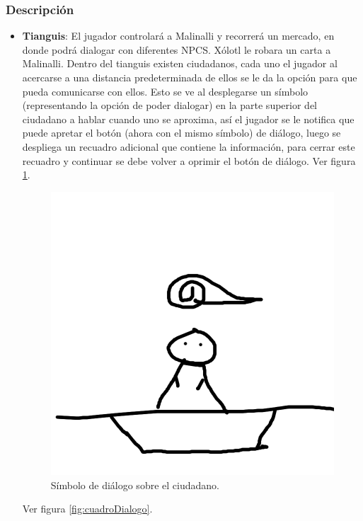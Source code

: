 \documentclass[11pt,letterpaper]{article}
\begin{document}
	\subsubsection{Descripción}
	\begin{itemize}
		\item\textbf{Tianguis}: El jugador controlará a Malinalli y recorrerá un mercado, en donde podrá dialogar con diferentes NPCS. Xólotl le robara un carta a Malinalli.
		Dentro del tianguis existen ciudadanos, cada uno el jugador al acercarse a una distancia predeterminada de ellos se le da la opción para que pueda comunicarse con ellos. Esto se ve al desplegarse un símbolo (representando la opción de poder dialogar) en la parte superior del ciudadano a hablar cuando uno se aproxima, así el jugador se le notifica que puede apretar el botón (ahora con el mismo símbolo) de diálogo, luego se despliega un recuadro adicional que contiene la información, para cerrar este recuadro y continuar se debe volver a oprimir el botón de diálogo.
		Ver figura \ref{fig:simboloDialogo}.
		\begin{figure}
			\centering
			\includegraphics[height=0.2 \textheight]{Imagenes/simboloDialogo}
			\caption{Símbolo de diálogo sobre el ciudadano.}
			\label{fig:simboloDialogo}
		\end{figure}
		Ver figura \ref{fig:cuadroDialogo}.
		\begin{figure}

\end{figure}
\end{itemize}
\end{document}
